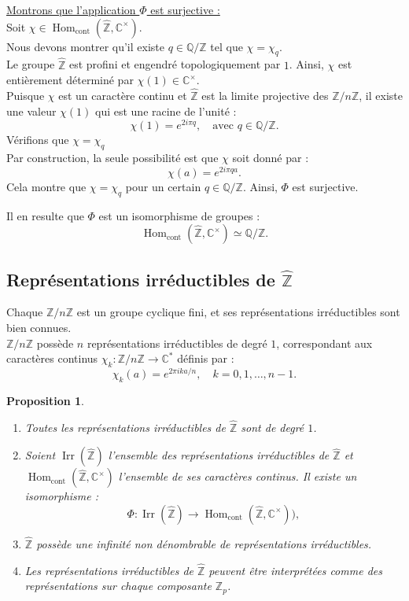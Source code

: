 \documentclass[a4paper, 14pt]{report}
\newtheorem{proposition}{Proposition}[section]
\begin{document}
\begin{onehalfspace}
{\underline{Montrons que l'application $\Phi$ est surjective :}\\
Soit $\chi \in \operatorname{Hom}_{\text{cont}}(\widehat{\mathbb{Z}}, \mathbb{C}^\times)$.  \\
Nous devons montrer qu'il existe $q \in \mathbb{Q}/\mathbb{Z}$ tel que $\chi = \chi_q$.\\
Le groupe $\widehat{\mathbb{Z}}$ est profini et engendré topologiquement par $1$. Ainsi, $\chi$ est entièrement déterminé par $\chi(1) \in \mathbb{C}^\times$.\\
Puisque $\chi$ est un caractère continu et $\widehat{\mathbb{Z}}$ est la limite projective des $\mathbb{Z}/n\mathbb{Z}$, il existe une valeur $\chi(1)$ qui est une racine de l’unité :
\[
\chi(1) = e^{2i\pi q}, \quad \text{avec } q \in \mathbb{Q}/\mathbb{Z}.
\]
Vérifions que $\chi = \chi_q$\\
Par construction, la seule possibilité est que $\chi$ soit donné par :
\[
\chi(a) = e^{2i\pi q a}.
\]
Cela montre que $\chi = \chi_q$ pour un certain $q \in \mathbb{Q}/\mathbb{Z}$. Ainsi, $\Phi$ est surjective.

Il en resulte que $\Phi$ est un isomorphisme de groupes :
\[
\operatorname{Hom}_{\text{cont}}(\widehat{\mathbb{Z}}, \mathbb{C}^\times) \simeq \mathbb{Q}/\mathbb{Z}.
\]


\subsection{Représentations irréductibles de $\widehat{\mathbb{Z}}$}
Chaque $\mathbb{Z}/n\mathbb{Z}$ est un groupe cyclique fini, et ses représentations irréductibles sont bien connues.\\
$\mathbb{Z}/n\mathbb{Z}$ possède $n$ représentations irréductibles de degré $1$, correspondant aux caractères continus $\chi_k : \mathbb{Z}/n\mathbb{Z} \to \mathbb{C}^*$ définis par :
\[
\chi_k(a) = e^{2\pi i k a / n}, \quad k = 0, 1, \dots, n-1.
\]


\begin{proposition}
\begin{enumerate} [label=\roman*)] \
	\item Toutes les représentations irréductibles de $\widehat{\mathbb{Z}}$ sont de degré $1$.
	\item Soient $\operatorname{Irr}(\widehat{\mathbb{Z}})$ l'ensemble des représentations irréductibles de $\widehat{\mathbb{Z}}$ et $\operatorname{Hom}_{\text{cont}}(\widehat{\mathbb{Z}}, \mathbb{C}^\times)$ l'ensemble de ses caractères continus. Il existe un isomorphisme :
	\[
	\Phi : \operatorname{Irr}(\widehat{\mathbb{Z}}) \to \operatorname{Hom}_{\text{cont}}(\widehat{\mathbb{Z}}, \mathbb{C}^\times)),
	\]
	\item $\widehat{\mathbb{Z}}$ possède une infinité non dénombrable de représentations irréductibles.
	\item Les représentations irréductibles de $\widehat{\mathbb{Z}}$ peuvent être interprétées comme des représentations sur chaque composante $\mathbb{Z}_p$.
\end{enumerate}
\end{proposition}


}
\end{onehalfspace}
\end{document}
